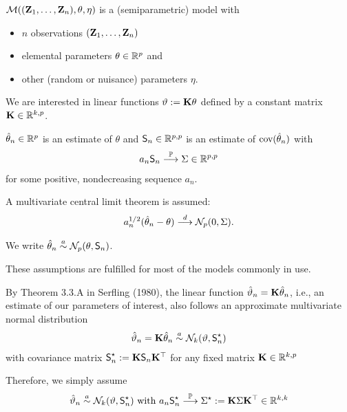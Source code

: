 \documentclass[landscape]{slides}
\begin{document}

$\mathcal{M}((\mathbf{Z}_1, \dots, \mathbf{Z}_n), \theta, \eta)$ is a (semiparametric) model with

\begin{itemize}
\item $n$ observations $(\mathbf{Z}_1, \dots, \mathbf{Z}_n)$
\item elemental parameters $\theta \in \mathbb{R}^p$ and
\item other (random or nuisance) parameters $\eta$.
\end{itemize}

We are interested in linear functions $\vartheta := \mathbf{K} \theta$ defined
by a constant matrix $\mathbf{K} \in \mathbb{R}^{k, p}$.


$\hat{\theta}_n \in \mathbb{R}^p$ is an estimate of $\theta$ and
$\textsf{S}_n \in \mathbb{R}^{p,p}$ is an estimate of $\text{cov}(\hat{\theta}_n)$ with
\begin{eqnarray*}
a_n \textsf{S}_n \stackrel{\mathbb{P}}{\longrightarrow} \Sigma \in \mathbb{R}^{p,p}
\end{eqnarray*}
for some positive, nondecreasing sequence $a_n$.

A multivariate central limit theorem is assumed:
\begin{eqnarray*}
a_n^{1/2} (\hat{\theta}_n - \theta) \stackrel{d}{\longrightarrow} \mathcal{N}_p(0, \Sigma).
\end{eqnarray*}

We write $\hat{\theta}_n \stackrel{a}{\sim} \mathcal{N}_p(\theta, \textsf{S}_n)$.

These assumptions are fulfilled for most of the models commonly in use.


By Theorem 3.3.A in
Serfling (1980), the linear function $\hat{\vartheta}_n = \mathbf{K} 
\hat{\theta}_n$, i.e., an estimate of our parameters of interest,
also follows an approximate multivariate normal
distribution
\begin{eqnarray*}
\hat{\vartheta}_n = \mathbf{K} \hat{\theta}_n \stackrel{a}{\sim} \mathcal{N}_k(\vartheta, \textsf{S}^\star_n)
\end{eqnarray*}
with covariance matrix $\textsf{S}^\star_n := \mathbf{K} \textsf{S}_n \mathbf{K}^\top$
for any fixed matrix $\mathbf{K} \in \mathbb{R}^{k,p}$

Therefore, we simply assume
\begin{eqnarray*}
\hat{\vartheta}_n \stackrel{a}{\sim} \mathcal{N}_k(\vartheta, \textsf{S}^\star_n) \text{ with }
a_n \textsf{S}^\star_n \stackrel{\mathbb{P}}{\longrightarrow} \Sigma^\star := \mathbf{K} \Sigma \mathbf{K}^\top \in \mathbb{R}^{k,k}
\end{eqnarray*}

\end{document}
